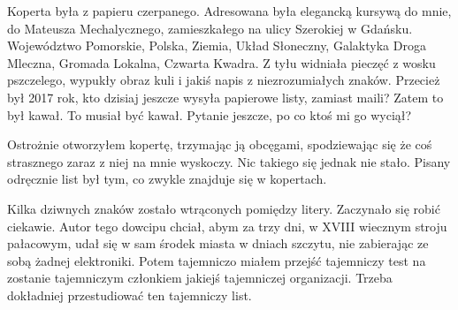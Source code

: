 Koperta była z papieru czerpanego.
Adresowana była elegancką kursywą do mnie, do Mateusza Mechalycznego, zamieszkałego na ulicy Szerokiej w Gdańsku.
Województwo Pomorskie, Polska, Ziemia, Układ Słoneczny, Galaktyka Droga Mleczna, Gromada Lokalna, Czwarta Kwadra.
Z tyłu widniała pieczęć z wosku pszczelego, wypukły obraz kuli i jakiś napis z niezrozumiałych znaków.
Przecież był 2017 rok, kto dzisiaj jeszcze wysyła papierowe listy, zamiast maili?
Zatem to był kawał. To musiał być kawał. Pytanie jeszcze, po co ktoś mi go wyciął?

Ostrożnie otworzyłem kopertę, trzymając ją obcęgami, spodziewając się że coś strasznego zaraz z niej na mnie wyskoczy.
Nic takiego się jednak nie stało.
Pisany odręcznie list był tym, co zwykle znajduje się w kopertach.


Kilka dziwnych znaków zostało wtrąconych pomiędzy litery. Zaczynało się robić ciekawie. Autor tego dowcipu chciał, abym za trzy dni, w XVIII wiecznym stroju pałacowym,
udał się w sam środek miasta w dniach szczytu, nie zabierając ze sobą żadnej elektroniki.
Potem tajemniczo miałem przejść tajemniczy test na zostanie tajemniczym członkiem jakiejś tajemniczej organizacji.
Trzeba dokładniej przestudiować ten tajemniczy list.

